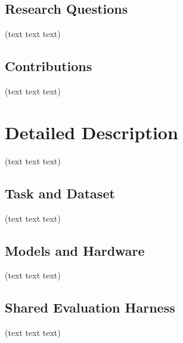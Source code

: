 \documentclass[10pt,a4paper,twocolumn]{article}
\begin{document}
\subsection{Research Questions}
(text text text)


\subsection{Contributions}
(text text text)


\section{Detailed Description}
(text text text)

\subsection{Task and Dataset}
(text text text)


\subsection{Models and Hardware}
(text text text)


\subsection{Shared Evaluation Harness}
(text text text)
\end{document}
